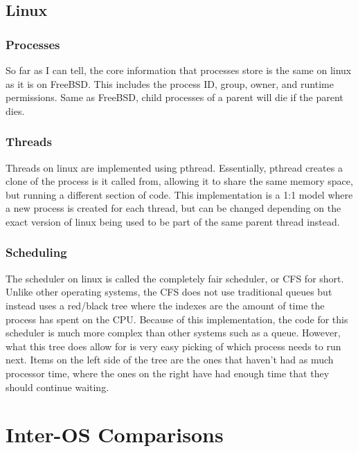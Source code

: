 \subsection{Linux}
\subsubsection{Processes}
So far as I can tell, the core information that processes store is the same on linux as it is on FreeBSD. This includes the process ID, group, owner, and runtime permissions. Same as FreeBSD, child processes of a parent will die if the parent dies.
\subsubsection{Threads}
Threads on linux are implemented using pthread. Essentially, pthread creates a clone of the process is it called from, allowing it to share the same memory space, but running a different section of code. This implementation is a 1:1 model where a new process is created for each thread, but can be changed depending on the exact version of linux being used to be part of the same parent thread instead. 
\subsubsection{Scheduling}
The scheduler on linux is called the completely fair scheduler, or CFS for short. Unlike other operating systems, the CFS does not use traditional queues but instead uses a red/black tree where the indexes are the amount of time the process has spent on the CPU. Because of this implementation, the code for this scheduler is much more complex than other systems such as a queue. However, what this tree does allow for is very easy picking of which process needs to run next. Items on the left side of the tree are the ones that haven't had as much processor time, where the ones on the right have had enough time that they should continue waiting.


\section{Inter-OS Comparisons}
